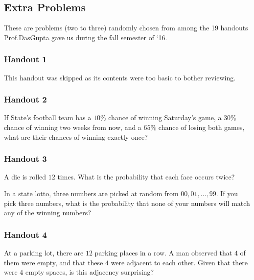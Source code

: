 \subsection{Extra Problems}
These are problems (two to three) randomly chosen from among the 19
handouts Prof.\@ DasGupta gave us during the fall semester of `16.
\subsubsection{Handout 1}
This handout was skipped as its contents were too basic to bother
reviewing.
\subsubsection{Handout 2}
\begin{problem}[Handout 2, \# 3]
If State's football team has a \(10\%\) chance of winning Saturday's game,
a \(30\%\) chance of winning two weeks from now, and a \(65\%\) chance of
losing both games, what are their chances of winning exactly once?
\end{problem}
\begin{solution*}
\end{solution*}

\subsubsection{Handout 3}
\begin{problem}[Handout 3, \# 4]
  A die is rolled \(12\) times. What is the probability that each face
  occurs twice?
\end{problem}
\begin{solution*}
\end{solution*}

\begin{problem}[Handout 3, \# 6]
  In a state lotto, three numbers are picked at random from
  \(00,01,\dotsc,99\). If you pick three numbers, what is the probability
  that none of your numbers will match any of the winning numbers?
\end{problem}
\begin{solution*}
\end{solution*}

\subsubsection{Handout 4}
\begin{problem}[Handout 4, \# 4]
  At a parking lot, there are \(12\) parking places in a row. A man
  observed that \(4\) of them were empty, and that these \(4\) were
  adjacent to each other. Given that there were \(4\) empty spaces, is this
  adjacency surprising?
\end{problem}
\begin{solution*}
\end{solution*}

